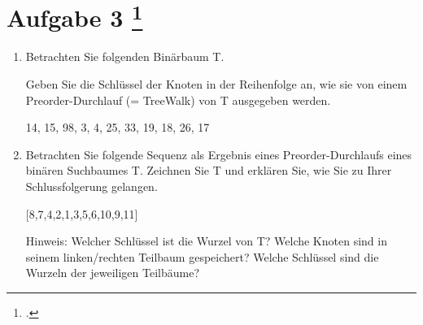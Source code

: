 \documentclass{lehramt-informatik-aufgabe}
\begin{document}
\section{Aufgabe 3
\footcite{66115:2021:03}}

\begin{enumerate}
\item Betrachten Sie folgenden Binärbaum T.

Geben Sie die Schlüssel der Knoten in der Reihenfolge an, wie sie von
einem Preorder-Durchlauf (= TreeWalk) von T ausgegeben werden.

\begin{center}
\end{center}

\begin{liAntwort}
14, 15, 98, 3, 4, 25, 33, 19, 18, 26, 17
\end{liAntwort}

\item Betrachten Sie folgende Sequenz als Ergebnis eines
Preorder-Durchlaufs eines binären Suchbaumes T. Zeichnen Sie T und
erklären Sie, wie Sie zu Ihrer Schlussfolgerung gelangen.

[8,7,4,2,1,3,5,6,10,9,11]

\begin{liAntwort}
\begin{center}
\end{center}
\end{liAntwort}

Hinweis: Welcher Schlüssel ist die Wurzel von T? Welche Knoten sind in
seinem linken/rechten Teilbaum gespeichert? Welche Schlüssel sind die
Wurzeln der jeweiligen Teilbäume?

\newpage


\end{enumerate}
\end{document}
